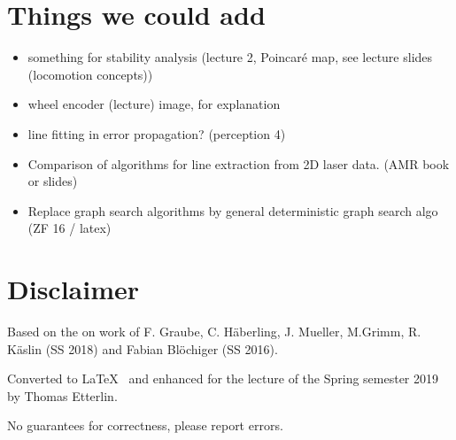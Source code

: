 \documentclass[fontsize=6pt]{scrartcl}
\begin{document}
\begin{multicols*}{4}
\section*{Things we could add}
\begin{itemize}
	\item something for stability analysis (lecture 2, Poincaré map, see lecture slides (locomotion concepts))
	\item wheel encoder (lecture) image, for explanation
	\item line fitting in error propagation? (perception 4)
	\item Comparison of algorithms for line extraction from 2D laser data. (AMR book or slides)
	\item Replace graph search algorithms by general deterministic graph search algo (ZF 16 / latex)
\end{itemize}

\section*{Disclaimer}
Based on the on work of F. Graube, C. Häberling, J. Mueller, M.Grimm, R. Käslin (SS 2018) and Fabian Blöchiger (SS 2016).

Converted to \LaTeX~ and enhanced for the lecture of the Spring semester 2019 by Thomas Etterlin.

No guarantees for correctness, please report errors.

\end{multicols*}
\end{document}
